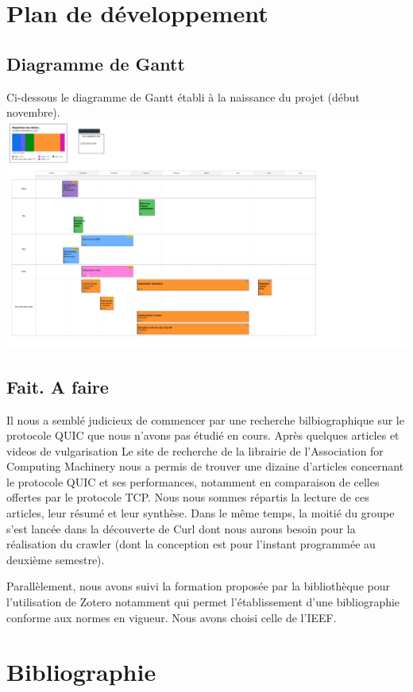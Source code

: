 \documentclass[a4paper,12pt]{article}
\begin{document}
\section{Plan de développement}
\subsection{Diagramme de Gantt}
Ci-dessous le diagramme de Gantt établi à la naissance du projet (début novembre).
\includegraphics[width=15cm]{Gantt chart.png}

\subsection{Fait. A faire}
Il nous a semblé judicieux de commencer par une recherche bilbiographique sur le protocole QUIC que nous n'avons pas étudié en cours. Après quelques articles et videos de vulgarisation \cite{Capitole_du_Libre_2019} Le site de recherche de la librairie de l'Association for Computing Machinery nous a permis de trouver une dizaine d'articles concernant le protocole QUIC et ses performances, notamment en comparaison de celles offertes par le protocole TCP. Nous nous sommes répartis la lecture de ces articles, leur résumé et leur synthèse. Dans le même temps, la moitié du groupe s'est lancée dans la découverte de Curl dont nous aurons besoin pour la réalisation du crawler (dont la conception est pour l'instant programmée au deuxième semestre).

Parallèlement, nous avons suivi la formation proposée par la bibliothèque pour l'utilisation de Zotero notamment qui permet l'établissement d'une bibliographie conforme aux normes en vigueur. Nous avons choisi celle de l'IEEF. 

\section{Bibliographie}
\end{document}
